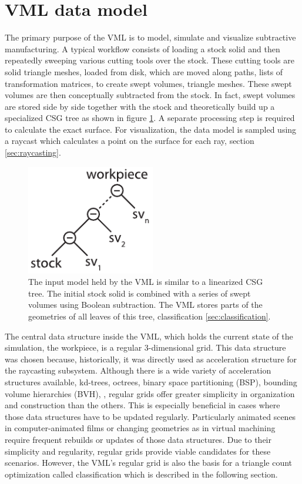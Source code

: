 \section{VML data model}
\label{sec:vml_data_model}

The primary purpose of the VML is to model, simulate and visualize subtractive manufacturing.
A typical workflow consists of loading a stock solid and then repeatedly sweeping various cutting tools over the stock.
These cutting tools are solid triangle meshes, loaded from disk, which are moved along paths, \ie lists of transformation matrices, to create swept volumes, \ie triangle meshes.
These swept volumes are then conceptually subtracted from the stock.
In fact, swept volumes are stored side by side together with the stock and theoretically build up a specialized CSG tree as shown in figure \ref{fig:vml_csg}.
A separate processing step is required to calculate the exact surface.
For visualization, the data model is sampled using a raycast which calculates a point on the surface for each ray, \cf section \ref{sec:raycasting}.

\begin{figure}[h]
	\centering
	\includegraphics[width=0.5\textwidth]{images/vml_csg}
	\caption{
		The input model held by the VML is similar to a linearized CSG tree.
		The initial stock solid is combined with a series of swept volumes using Boolean subtraction.
		The VML stores parts of the geometries of all leaves of this tree, \cf classification \ref{sec:classification}.
	}
	\label{fig:vml_csg}
\end{figure}


The central data structure inside the VML, which holds the current state of the simulation, \ie the workpiece, is a regular 3-dimensional grid.
This data structure was chosen because, historically, it was directly used as acceleration structure for the raycasting subsystem.
Although there is a wide variety of acceleration structures available, \eg kd-trees, octrees, binary space partitioning (BSP), bounding volume hierarchies (BVH), \etc, regular grids offer greater simplicity in organization and construction than the others.
This is especially beneficial in cases where those data structures have to be updated regularly.
Particularly animated scenes in computer-animated films or changing geometries as in virtual machining require frequent rebuilds or updates of those data structures.
Due to their simplicity and regularity, regular grids provide viable candidates for these scenarios.
However, the VML's regular grid is also the basis for a triangle count optimization called classification which is described in the following section.


